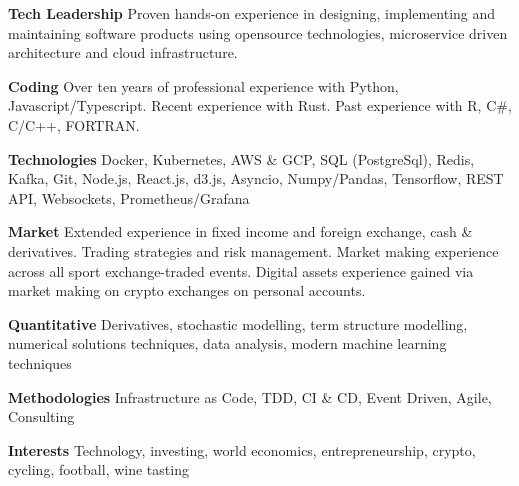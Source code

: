 {\bf Tech Leadership} Proven hands-on experience in designing, implementing and maintaining software products
using opensource technologies, microservice driven architecture and cloud infrastructure.

{\bf Coding} Over ten years of professional experience with Python, Javascript/Typescript. Recent experience with Rust.
Past experience with R, C\#, C/C++, FORTRAN.

{\bf Technologies} Docker, Kubernetes, AWS \& GCP, SQL (PostgreSql), Redis, Kafka, Git, Node.js, React.js, d3.js, Asyncio, Numpy/Pandas,
Tensorflow, REST API, Websockets, Prometheus/Grafana

{\bf Market} Extended experience in fixed income and foreign exchange, cash \& derivatives.
Trading strategies and risk management.
Market making experience across all sport exchange-traded events.
Digital assets experience gained via market making on crypto exchanges on personal accounts.

{\bf Quantitative} Derivatives, stochastic modelling, term structure modelling, numerical solutions techniques,
data analysis, modern machine learning techniques

{\bf Methodologies} Infrastructure as Code, TDD, CI \& CD, Event Driven, Agile, Consulting

{\bf Interests} Technology, investing, world economics, entrepreneurship, crypto, cycling, football, wine tasting
